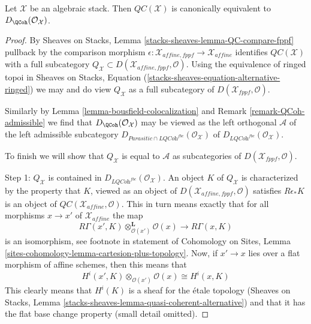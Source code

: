 \begin{proposition}
\label{proposition-QC-compare}
Let $\mathcal{X}$ be an algebraic stack. Then $\mathit{QC}(\mathcal{X})$
is canonically equivalent to $D_\QCoh(\mathcal{O}_\mathcal{X})$.
\end{proposition}

\begin{proof}
By Sheaves on Stacks, Lemma \ref{stacks-sheaves-lemma-QC-compare-fppf}
pullback by the comparison morphism
$\epsilon : \mathcal{X}_{affine, fppf} \to \mathcal{X}_{affine}$
identifies $\mathit{QC}(\mathcal{X})$ with a full subcategory
$Q_\mathcal{X} \subset D(\mathcal{X}_{affine, fppf}, \mathcal{O})$.
Using the equivalence of ringed topoi in
Sheaves on Stacks, Equation (\ref{stacks-sheaves-equation-alternative-ringed})
we may and do view $Q_\mathcal{X}$ as a full subcategory of
$D(\mathcal{X}_{fppf}, \mathcal{O})$.

\medskip\noindent
Similarly by Lemma \ref{lemma-bousfield-colocalization} and
Remark \ref{remark-QCoh-admissible} we find that
$D_\QCoh(\mathcal{O}_\mathcal{X})$ may be viewed as the
left orthogonal $\mathcal{A}$ of the left admissible subcategory
$D_{\textit{Parasitic} \cap \textit{LQCoh}^{fbc}}(\mathcal{O}_\mathcal{X})$
of $D_{\textit{LQCoh}^{fbc}}(\mathcal{O}_\mathcal{X})$.

\medskip\noindent
To finish we will show that $Q_\mathcal{X}$ is equal to
$\mathcal{A}$ as subcategories of $D(\mathcal{X}_{fppf}, \mathcal{O})$.

\medskip\noindent
Step 1: $Q_\mathcal{X}$ is contained in
$D_{\textit{LQCoh}^{fbc}}(\mathcal{O}_\mathcal{X})$.
An object $K$ of $Q_\mathcal{X}$ is characterized by the property
that $K$, viewed as an object of $D(\mathcal{X}_{affine, fppf}, \mathcal{O})$
satisfies $R\epsilon_*K$ is an object of
$\mathit{QC}(\mathcal{X}_{affine}, \mathcal{O})$.
This in turn means exactly that for all morphisms $x \to x'$
of $\mathcal{X}_{affine}$ the map
$$
R\Gamma(x', K) \otimes_{\mathcal{O}(x')}^\mathbf{L} \mathcal{O}(x)
\longrightarrow
R\Gamma(x, K)
$$
is an isomorphism, see footnote in statement of Cohomology on Sites,
Lemma \ref{sites-cohomology-lemma-cartesion-plus-topology}.
Now, if $x' \to x$ lies over a flat morphism of affine schemes,
then this means that
$$
H^i(x', K) \otimes_{\mathcal{O}(x')} \mathcal{O}(x)
\cong
H^i(x, K)
$$
This clearly means that $H^i(K)$ is a sheaf for the \'etale topology
(Sheaves on Stacks, Lemma \ref{stacks-sheaves-lemma-quasi-coherent-alternative})
and that it has the flat base change property (small detail omitted).


\end{proof}
